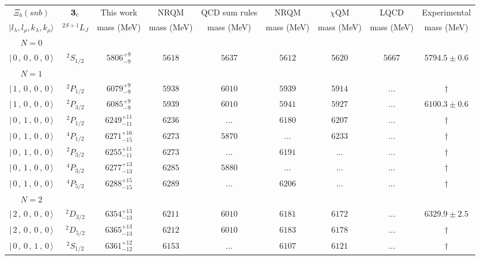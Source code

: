 \begin{tabular}{c c| c c c c c c c}\hline \hline
$\Xi_{b}(snb)$& ${\bf {3}}_{\rm c}$& This work   &   NRQM \cite{Yoshida2015}     &  QCD sum rules \cite{Liu2008, Mao2015, Chen2016}      &  NRQM \cite{Roberts2008}    & $\chi$QM \cite{Kim2021}        & LQCD \cite{Mohanta2020}     & Experimental  \\ 
 $\vert l_{\lambda}, l_{\rho}, k_{\lambda}, k_{\rho} \rangle$ & $^{2S+1}L_{J}$ & mass (MeV)  &   mass (MeV)  &  mass (MeV)  &  mass (MeV) & mass (MeV) & mass (MeV) &      mass (MeV) \\ \hline
\hline
 $N=0$  &  &  &  &  &  \\ 
$\vert \,0\,,\,0\,,\,0\,,\,0 \,\rangle $ & $^{2}S_{1/2}$ & $5806^{+9}_{-9}$ & $5618$ & $5637$ & $5612$ & $5620$ & $5667$ & $5794.5\pm 0.6$ \\ 
\hline
 $N=1$  &  &  &  &  &  \\ 
$\vert \,1\,,\,0\,,\,0\,,\,0 \,\rangle $ & $^{2}P_{1/2}$ & $6079^{+9}_{-9}$ & $5938$ & $6010$ & $5939$ & $5914$ & ... & $\dagger$ \\ 
$\vert \,1\,,\,0\,,\,0\,,\,0 \,\rangle $ & $^{2}P_{3/2}$ & $6085^{+9}_{-9}$ & $5939$ & $6010$ & $5941$ & $5927$ & ... & $6100.3\pm 0.6$ \\ 
$\vert \,0\,,\,1\,,\,0\,,\,0 \,\rangle $ & $^{2}P_{1/2}$ & $6249^{+11}_{-11}$ & $6236$ & ... & $6180$ & $6207$ & ... & $\dagger$ \\ 
$\vert \,0\,,\,1\,,\,0\,,\,0 \,\rangle $ & $^{4}P_{1/2}$ & $6271^{+16}_{-15}$ & $6273$ & $5870$ & ... & $6233$ & ... & $\dagger$ \\ 
$\vert \,0\,,\,1\,,\,0\,,\,0 \,\rangle $ & $^{2}P_{3/2}$ & $6255^{+11}_{-11}$ & $6273$ & ... & $6191$ & ... & ... & $\dagger$ \\ 
$\vert \,0\,,\,1\,,\,0\,,\,0 \,\rangle $ & $^{4}P_{3/2}$ & $6277^{+13}_{-13}$ & $6285$ & $5880$ & ... & ... & ... & $\dagger$ \\ 
$\vert \,0\,,\,1\,,\,0\,,\,0 \,\rangle $ & $^{4}P_{5/2}$ & $6288^{+15}_{-15}$ & $6289$ & ... & $6206$ & ... & ... & $\dagger$ \\ 
\hline
 $N=2$  &  &  &  &  &  \\ 
$\vert \,2\,,\,0\,,\,0\,,\,0 \,\rangle $ & $^{2}D_{3/2}$ & $6354^{+13}_{-13}$ & $6211$ & $6010$ & $6181$ & $6172$ & ... & $6329.9\pm 2.5$ \\ 
$\vert \,2\,,\,0\,,\,0\,,\,0 \,\rangle $ & $^{2}D_{5/2}$ & $6365^{+13}_{-13}$ & $6212$ & $6010$ & $6183$ & $6178$ & ... & $\dagger$ \\ 
$\vert \,0\,,\,0\,,\,1\,,\,0 \,\rangle $ & $^{2}S_{1/2}$ & $6361^{+12}_{-12}$ & $6153$ & ... & $6107$ & $6121$ & ... & $\dagger$ \\ 

\end{tabular}
